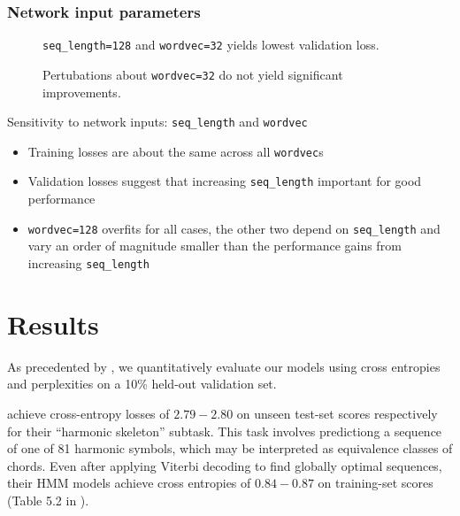 \subsubsection{Network input parameters}


\begin{figure}[tb]
    \centering
    
    \caption{\texttt{seq\_length=128} and \texttt{wordvec=32} yields lowest validation loss.}
    \label{fig:torch-rnn-input-params}
\end{figure}

\begin{figure}[tb]
  \centering
  
  \caption{Pertubations about \texttt{wordvec=32} do not yield significant improvements.}
  \label{fig:torch-rnn-input-params-wordvec}
\end{figure}

Sensitivity to network inputs: \texttt{seq\_length} and \texttt{wordvec}
\begin{itemize}
    \item Training losses are about the same across all \texttt{wordvec}s
    \item Validation losses suggest that increasing \texttt{seq\_length} important for good performance 
    \item \texttt{wordvec=128} overfits for all cases, the other two depend on \texttt{seq\_length} and vary an order of magnitude smaller than the performance gains from increasing \texttt{seq\_length}
\end{itemize}

\section{Results}

As precedented by \citep{bayer2013fast,Boulanger-Lewandowski2012}, we
quantitatively evaluate our models using cross entropies and
perplexities on a 10\% held-out validation set.

\citet{Allan2005} achieve cross-entropy losses of $2.79-2.80$ on unseen
test-set scores respectively for their ``harmonic skeleton'' subtask. This task
involves predictiong a sequence of one of 81 harmonic symbols, which may be
interpreted as equivalence classes of chords. Even after applying Viterbi
decoding to find globally optimal sequences, their HMM models achieve cross
entropies of $0.84-0.87$ on training-set scores (Table 5.2 in
\citet{Allan2005}).

